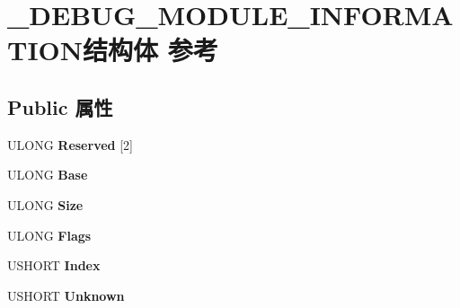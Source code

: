 \hypertarget{struct___d_e_b_u_g___m_o_d_u_l_e___i_n_f_o_r_m_a_t_i_o_n}{}\section{\+\_\+\+D\+E\+B\+U\+G\+\_\+\+M\+O\+D\+U\+L\+E\+\_\+\+I\+N\+F\+O\+R\+M\+A\+T\+I\+O\+N结构体 参考}
\label{struct___d_e_b_u_g___m_o_d_u_l_e___i_n_f_o_r_m_a_t_i_o_n}
\subsection*{Public 属性}
\begin{DoxyCompactItemize}
\item 
\mbox{\label{struct___d_e_b_u_g___m_o_d_u_l_e___i_n_f_o_r_m_a_t_i_o_n_a44428dab7d4ea9e0278a18599ccc3153}} 
U\+L\+O\+NG {\bfseries Reserved} \mbox{[}2\mbox{]}
\item 
\mbox{\label{struct___d_e_b_u_g___m_o_d_u_l_e___i_n_f_o_r_m_a_t_i_o_n_a34cd3960c4927b15551ab6087015238f}} 
U\+L\+O\+NG {\bfseries Base}
\item 
\mbox{\label{struct___d_e_b_u_g___m_o_d_u_l_e___i_n_f_o_r_m_a_t_i_o_n_a206e99acea9810e8d3941d7a96d7eeee}} 
U\+L\+O\+NG {\bfseries Size}
\item 
\mbox{\label{struct___d_e_b_u_g___m_o_d_u_l_e___i_n_f_o_r_m_a_t_i_o_n_a5ce6ddf49eb672e386f2fca0ce04af6e}} 
U\+L\+O\+NG {\bfseries Flags}
\item 
\mbox{\label{struct___d_e_b_u_g___m_o_d_u_l_e___i_n_f_o_r_m_a_t_i_o_n_a42297cfb5d66f485a568bf3b99c8dbb8}} 
U\+S\+H\+O\+RT {\bfseries Index}
\item 
\mbox{\label{struct___d_e_b_u_g___m_o_d_u_l_e___i_n_f_o_r_m_a_t_i_o_n_aadedeb00d567204e9c15462e7694845d}} 
U\+S\+H\+O\+RT {\bfseries Unknown}
\item 

\end{DoxyCompactItemize}
